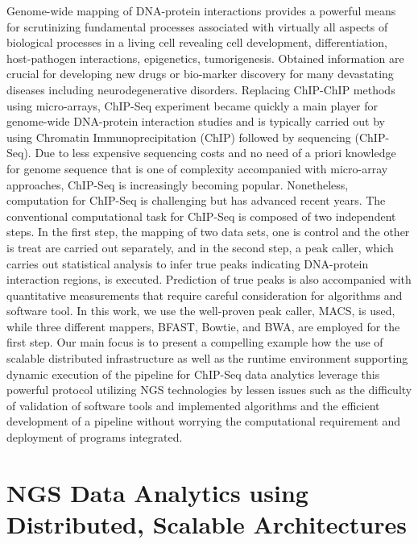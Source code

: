 \documentclass{cpeauth}
\begin{document}
Genome-wide mapping of DNA-protein interactions provides a powerful means for scrutinizing fundamental processes associated with virtually all aspects of biological processes in a living cell revealing cell development, differentiation, host-pathogen interactions, epigenetics, tumorigenesis. Obtained information are crucial for developing new drugs or bio-marker discovery for many devastating diseases including neurodegenerative disorders\cite{pepke2009,laajala}.  Replacing ChIP-ChIP methods using micro-arrays, ChIP-Seq experiment became quickly a main player for genome-wide DNA-protein interaction studies and is typically carried out by using Chromatin Immunoprecipitation (ChIP) followed by sequencing (ChIP-Seq).  Due to less expensive sequencing costs and no need of a priori knowledge for genome sequence that is one of complexity accompanied with micro-array approaches, ChIP-Seq is increasingly becoming popular.  Nonetheless, computation for ChIP-Seq is challenging but has advanced recent years\cite{pepke2009,laajala}.  The conventional computational task for ChIP-Seq is composed of two independent steps.  In the first step, the mapping of two data sets, one is control and the other is treat are carried out separately, and in the second step, a peak caller, which carries out statistical analysis to infer true peaks indicating DNA-protein interaction regions, is executed.  Prediction of true peaks is also accompanied with quantitative measurements that require careful consideration for algorithms and software tool.  In this work, we use the well-proven peak caller, MACS\cite{macs}, is used, while three different mappers, BFAST, Bowtie, and BWA, are employed for the first step.  Our main focus is to present a compelling example how the use of scalable distributed infrastructure as well as the runtime environment supporting dynamic execution of the pipeline for ChIP-Seq data analytics leverage this powerful protocol utilizing NGS technologies by lessen issues such as the difficulty of validation of software tools and implemented algorithms and the efficient development of a pipeline without worrying the computational requirement and deployment of programs integrated.   


\section{NGS Data Analytics using Distributed, Scalable Architectures}
\end{document}
